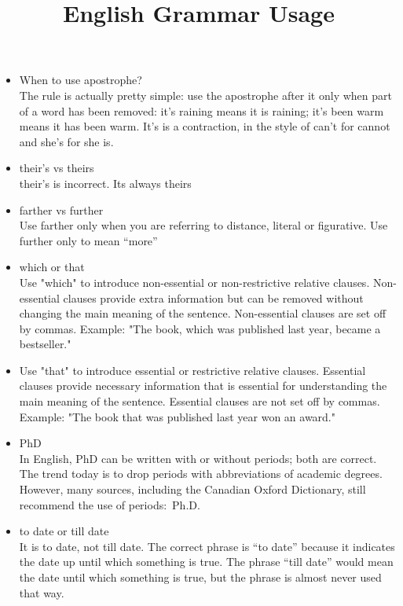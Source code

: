 \documentclass{../template/texnote}
\title{English Grammar Usage}
\begin{document}
    \maketitle {}
	\begin{itemize}
		\item When to use apostrophe?\\
The rule is actually pretty simple: use the apostrophe after it only when part of a word has been removed: it's raining means it is raining; it's been warm means it has been warm. It's is a contraction, in the style of can't for cannot and she's for she is.

\item their's vs theirs \\
their's is incorrect. Its always theirs

\item farther vs further \\
Use farther only when you are referring to distance, literal or figurative. Use further only to mean “more”

\item which or that \\
Use "which" to introduce non-essential or non-restrictive relative clauses. Non-essential clauses provide extra information but can be removed without changing the main meaning of the sentence. Non-essential clauses are set off by commas. Example: "The book, which was published last year, became a bestseller."

\item Use "that" to introduce essential or restrictive relative clauses. Essential clauses provide necessary information that is essential for understanding the main meaning of the sentence. Essential clauses are not set off by commas. Example: "The book that was published last year won an award."

\item PhD \\
In English, PhD can be written with or without periods; both are correct. The trend today is to drop periods with abbreviations of academic degrees. However, many sources, including the Canadian Oxford Dictionary, still recommend the use of periods: Ph.D.

\item to date or till date \\
It is to date, not till date. The correct phrase is “to date” because it indicates the date up until which something is true. The phrase “till date” would mean the date until which something is true, but the phrase is almost never used that way.


\end{itemize}
\end{document}
